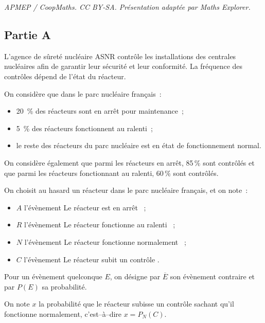 \documentclass[10pt]{article}
\begin{document}
\noindent\textit{APMEP / CoopMaths. CC BY-SA. Présentation adaptée par Maths Explorer.}\par\medskip
\medskip

\subsection*{Partie A}

L'agence de sûreté nucléaire ASNR contrôle les installations des centrales nucléaires afin de garantir leur sécurité et leur conformité. La fréquence des contrôles dépend de l'état du réacteur.

On considère que dans le parc nucléaire français~:
\begin{itemize}[noitemsep]
\item 20~\% des réacteurs sont en arrêt pour maintenance~;
\item 5~\% des réacteurs fonctionnent au ralenti~;
\item le reste des réacteurs du parc nucléaire est en état de fonctionnement normal.
\end{itemize}

On considère également que parmi les réacteurs en arrêt, 85\,\% sont contrôlés et que parmi les réacteurs fonctionnant au ralenti, 60\,\% sont contrôlés.

On choisit au hasard un réacteur dans le parc nucléaire français, et on note~:
\begin{itemize}[noitemsep]
\item $A$ l'évènement \og Le réacteur est en arrêt \fg~;
\item $R$ l'évènement \og Le réacteur fonctionne au ralenti \fg~;
\item $N$ l'évènement \og Le réacteur fonctionne normalement \fg~;
\item $C$ l'évènement \og Le réacteur subit un contrôle \fg.
\end{itemize}

Pour un évènement quelconque $E$, on désigne par $\overline{E}$ son évènement contraire et par $P(E)$ sa probabilité.

On note $x$ la probabilité que le réacteur subisse un contrôle sachant qu'il fonctionne normalement, c'est--à--dire $x = P_N(C)$.

\medskip
\end{document}
